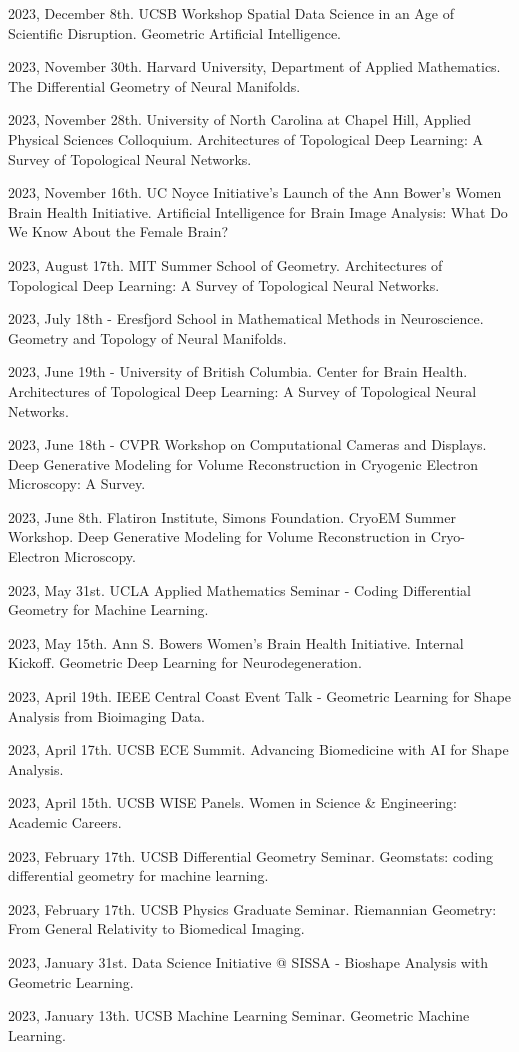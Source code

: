 2023, December 8th. UCSB Workshop Spatial Data Science in an Age of Scientific Disruption. Geometric Artificial Intelligence.

2023, November 30th. Harvard University, Department of Applied Mathematics. The Differential Geometry of Neural Manifolds.

2023, November 28th. University of North Carolina at Chapel Hill, Applied Physical Sciences Colloquium. Architectures of Topological Deep Learning: A Survey of Topological Neural Networks.

2023, November 16th. UC Noyce Initiative's Launch of the Ann Bower's Women Brain Health Initiative. Artificial Intelligence for Brain Image Analysis: What Do We Know About the Female Brain? 

2023, August 17th. MIT Summer School of Geometry. Architectures of Topological Deep Learning: A Survey of Topological Neural Networks.

2023, July 18th - Eresfjord School in Mathematical Methods in Neuroscience. Geometry and Topology of Neural Manifolds.

2023, June 19th - University of British Columbia. Center for Brain Health. Architectures of Topological Deep Learning: A Survey of Topological Neural Networks.

2023, June 18th - CVPR Workshop on Computational Cameras and Displays. Deep Generative Modeling for Volume Reconstruction in Cryogenic Electron Microscopy: A Survey.

2023, June 8th. Flatiron Institute, Simons Foundation. CryoEM Summer Workshop. Deep Generative Modeling for Volume Reconstruction in Cryo-Electron Microscopy.

2023, May 31st. UCLA Applied Mathematics Seminar - Coding Differential Geometry for Machine Learning.

2023, May 15th. Ann S. Bowers Women’s Brain Health Initiative. Internal Kickoff. Geometric Deep Learning for Neurodegeneration.

2023, April 19th. IEEE Central Coast Event Talk - Geometric Learning for Shape Analysis from Bioimaging Data.

2023, April 17th. UCSB ECE Summit. Advancing Biomedicine with AI for Shape Analysis.

2023, April 15th. UCSB WISE Panels. Women in Science \& Engineering: Academic Careers.

2023, February 17th. UCSB Differential Geometry Seminar. Geomstats: coding differential geometry for machine learning.

2023, February 17th. UCSB Physics Graduate Seminar. Riemannian Geometry: From General Relativity to Biomedical Imaging.

2023, January 31st. Data Science Initiative @ SISSA - Bioshape Analysis with Geometric Learning.

2023, January 13th. UCSB Machine Learning Seminar. Geometric Machine Learning.